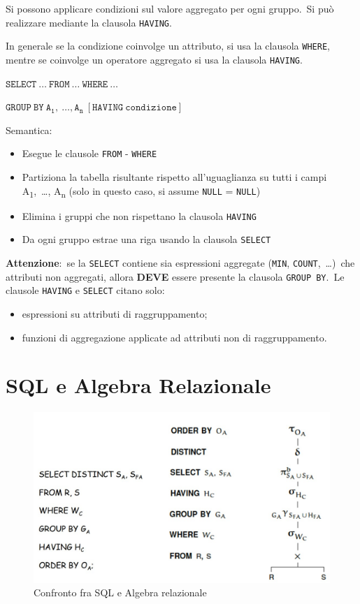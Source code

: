 Si possono applicare condizioni sul valore aggregato per ogni gruppo.\
Si può realizzare mediante la clausola \texttt{HAVING}.

In generale se la condizione coinvolge un attributo, si usa la clausola \texttt{WHERE}, mentre se coinvolge un operatore aggregato si usa la clausola \texttt{HAVING}.

\begin{flushleft}
	$\mathtt{SELECT\ \dots\ FROM\ \dots\ WHERE\ \dots\ }$

	$\mathtt{GROUP\ BY\ A_1,\ \dots, A_n\ [HAVING\ condizione]}$
\end{flushleft}

\noindent Semantica:
\begin{itemize}
	\item Esegue le clausole \texttt{FROM} - \texttt{WHERE}
	\item Partiziona la tabella risultante rispetto all'uguaglianza su tutti i campi A\textsubscript{1},\ \dots, A\textsubscript{n} (solo in questo caso, si assume \texttt{NULL} = \texttt{NULL})
	\item Elimina i gruppi che non rispettano la clausola \texttt{HAVING}
	\item Da ogni gruppo estrae una riga usando la clausola \texttt{SELECT}
\end{itemize}

\noindent\textbf{Attenzione}:\ se la \texttt{SELECT} contiene sia espressioni aggregate (\texttt{MIN}, \texttt{COUNT},\ \dots)\ che attributi non aggregati, allora \textbf{DEVE} essere presente la clausola \texttt{GROUP BY}.\
Le clausole \texttt{HAVING} e \texttt{SELECT} citano solo:
\begin{itemize}
	\item espressioni su attributi di raggruppamento;
	\item funzioni di aggregazione applicate ad attributi non di raggruppamento.
\end{itemize}

\section{SQL e Algebra Relazionale}

\begin{figure}[H]
	\centering
	\includegraphics[width=\textwidth]{immagini/SQL_alRel.jpg}
	\caption*{Confronto fra SQL e Algebra relazionale}
\end{figure}

